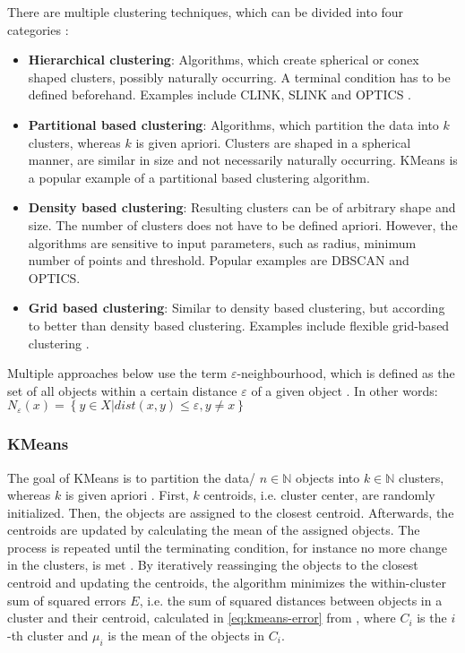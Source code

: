There are multiple clustering techniques, which can be divided into four categories \cite{OPTICS2016}: 
\begin{itemize}
    \item \textbf{Hierarchical clustering}:
    Algorithms, which create spherical or conex shaped clusters, possibly naturally occurring. 
    A terminal condition has to be defined beforehand.
    Examples include CLINK, SLINK \cite{OPTICS2014} and OPTICS \cite{OPTICS2013}.

    \item \textbf{Partitional based clustering}: 
    Algorithms, which partition the data into $k$ clusters, whereas $k$ is given apriori.
    Clusters are shaped in a spherical manner, are similar in size and not necessarily naturally occurring.
    KMeans is a popular example of a partitional based clustering algorithm.

    \item \textbf{Density based clustering}:
    Resulting clusters can be of arbitrary shape and size.
    The number of clusters does not have to be defined apriori.
    However, the algorithms are sensitive to input parameters, such as radius, minimum number of points and threshold.
    Popular examples are DBSCAN and OPTICS.
    
    \item \textbf{Grid based clustering}:
    Similar to density based clustering, but according to \citeauthor{OPTICS2016} better than density based clustering.
    Examples include flexible grid-based clustering \cite{OPTICS2014}.
    
\end{itemize}

Multiple approaches below use the term $\varepsilon$-neighbourhood, which is defined as the set of all objects within a certain distance $\varepsilon$ of a given object \cite{OPTICS2013}.
In other words: $N_\varepsilon (x) = \left\{ y \in X | dist(x,y) \le \varepsilon, y \neq x \right\}$ 


\subsubsection{KMeans}\label{subsec:kmeans}

The goal of KMeans is to partition the data/ $n \in \mathbb{N}$  objects into $k \in \mathbb{N}$  clusters, whereas $k$ is given apriori \cite{OPTICS_kMeans_2016}. %
First, $k$ centroids, i.e. cluster center, are randomly initialized.
Then, the objects are assigned to the closest centroid.
Afterwards, the centroids are updated by calculating the mean of the assigned objects.
The process is repeated until the terminating condition, for instance no more change in the clusters, is met \cite{OPTICS_kMeans_2016}.
By iteratively reassinging the objects to the closest centroid and updating the centroids, 
the algorithm minimizes the within-cluster sum of squared errors $E$, i.e. the sum of squared distances between objects in a cluster and their centroid, 
calculated in \autoref{eq:kmeans-error} from \cite{OPTICS_kMeans_2016}, 
where $C_{i}$ is the $i$-th cluster and $\mu_{i}$ is the mean of the objects in $C_{i}$.

